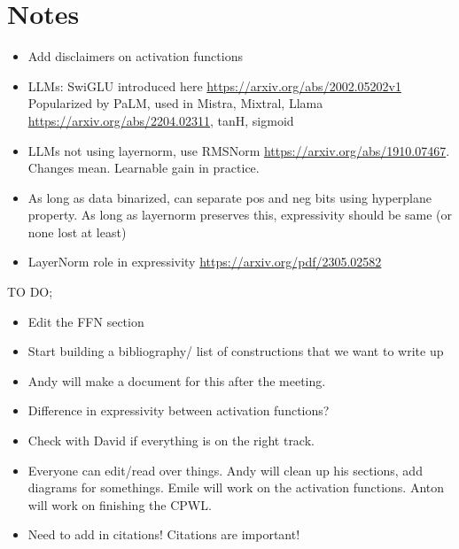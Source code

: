 \documentclass{article}
\begin{document}
\section{Notes}
\begin{itemize}
    \item Add disclaimers on activation functions
    \item LLMs: SwiGLU introduced here \url{https://arxiv.org/abs/2002.05202v1} Popularized by PaLM, used in Mistra, Mixtral, Llama \url{https://arxiv.org/abs/2204.02311}, tanH, sigmoid
    \item LLMs not using layernorm, use RMSNorm \url{https://arxiv.org/abs/1910.07467}. Changes mean. Learnable gain in practice. 
    \item As long as data binarized, can separate pos and neg bits using hyperplane property. As long as layernorm preserves this, expressivity should be same (or none lost at least)
    \item LayerNorm role in expressivity \url{https://arxiv.org/pdf/2305.02582}
\end{itemize}

TO DO;
\begin{itemize}
    \item Edit the FFN section
    \item Start building a bibliography/ list of constructions that we want to write up
    \item Andy will make a document for this after the meeting.
    \item Difference in expressivity between activation functions?
    \item Check with David if everything is on the right track.
    \item Everyone can edit/read over things. Andy will clean up his sections, add diagrams for somethings. Emile will work on the activation functions. Anton will work on finishing the CPWL. 
    \item Need to add in citations! Citations are important!
\end{itemize}



\end{document}
